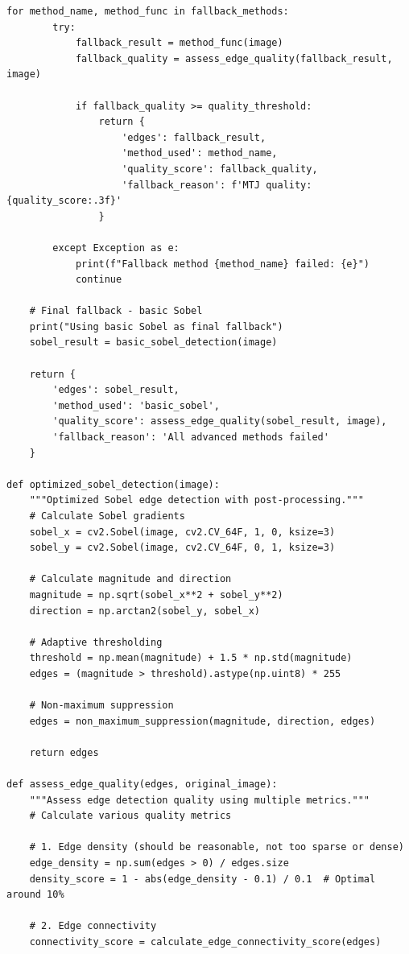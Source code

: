 \documentclass[conference]{IEEEtran}
\begin{document}
{{{{{{{{{{\begin{lstlisting}[caption={Intelligent fallback system with performance monitoring}]
    for method_name, method_func in fallback_methods:
        try:
            fallback_result = method_func(image)
            fallback_quality = assess_edge_quality(fallback_result, image)
            
            if fallback_quality >= quality_threshold:
                return {
                    'edges': fallback_result,
                    'method_used': method_name,
                    'quality_score': fallback_quality,
                    'fallback_reason': f'MTJ quality: {quality_score:.3f}'
                }
                
        except Exception as e:
            print(f"Fallback method {method_name} failed: {e}")
            continue
    
    # Final fallback - basic Sobel
    print("Using basic Sobel as final fallback")
    sobel_result = basic_sobel_detection(image)
    
    return {
        'edges': sobel_result,
        'method_used': 'basic_sobel',
        'quality_score': assess_edge_quality(sobel_result, image),
        'fallback_reason': 'All advanced methods failed'
    }

def optimized_sobel_detection(image):
    """Optimized Sobel edge detection with post-processing."""
    # Calculate Sobel gradients
    sobel_x = cv2.Sobel(image, cv2.CV_64F, 1, 0, ksize=3)
    sobel_y = cv2.Sobel(image, cv2.CV_64F, 0, 1, ksize=3)
    
    # Calculate magnitude and direction
    magnitude = np.sqrt(sobel_x**2 + sobel_y**2)
    direction = np.arctan2(sobel_y, sobel_x)
    
    # Adaptive thresholding
    threshold = np.mean(magnitude) + 1.5 * np.std(magnitude)
    edges = (magnitude > threshold).astype(np.uint8) * 255
    
    # Non-maximum suppression
    edges = non_maximum_suppression(magnitude, direction, edges)
    
    return edges

def assess_edge_quality(edges, original_image):
    """Assess edge detection quality using multiple metrics."""
    # Calculate various quality metrics
    
    # 1. Edge density (should be reasonable, not too sparse or dense)
    edge_density = np.sum(edges > 0) / edges.size
    density_score = 1 - abs(edge_density - 0.1) / 0.1  # Optimal around 10%
    
    # 2. Edge connectivity
    connectivity_score = calculate_edge_connectivity_score(edges)
    

\end{lstlisting}}}}}}}}}}}
\end{document}
